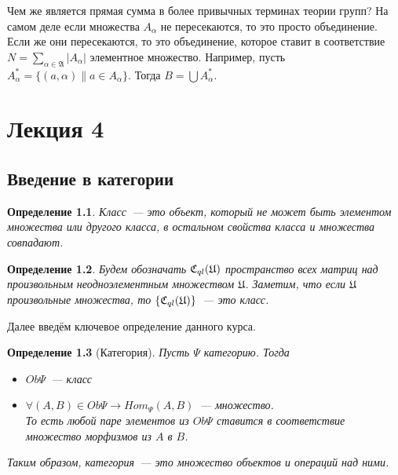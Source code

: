 \documentclass[a4paper, 12pt]{report}
\newtheorem{definition}{Определение}[chapter]
\begin{document}
Чем же является прямая сумма в более привычных терминах теории групп? На самом деле если множества $A_{\alpha}$ не пересекаются, то это просто объединение. Если же они пересекаются, то это объединение, которое ставит в соответствие $N = \sum_{\alpha\in\mathfrak{A}} |A_{\alpha}|$ элементное множество. Например, пусть $A^*_{\alpha} = \{(a, \alpha)\| a \in A_{\alpha}\}$. Тогда $B = \bigcup A^*_{\alpha}$.

\chapter{Лекция 4}
\section{Введение в категории}
\begin{definition}
Класс~--- это объект, который не может быть элементом множества или другого класса, в остальном свойства класса и множества совпадают.
\end{definition}

\begin{definition}
Будем обозначать $\mathfrak{C}_{ql}(\mathfrak{U})$ пространство всех матриц над произвольным неодноэлементным множеством $\mathfrak{U}$. Заметим, что если $\mathfrak{U}$ произвольные множества, то $\{\mathfrak{C}_{ql}(\mathfrak{U})\}$~--- это класс.
\end{definition}

Далее введём ключевое определение данного курса.

\begin{definition}[Категория]
Пусть $\Psi$ категорию. Тогда
\begin{itemize}
  \item $Ob\Psi$~--- класс
  \item $\forall (A, B) \in Ob\Psi \rightarrow Hom_{\Psi} (A, B)$~--- множество. \\ То есть любой паре элементов из $Ob\Psi$ ставится в соответствие множество морфизмов из $A$ в $B$.
\end{itemize}
Таким образом, категория~--- это множество объектов и операций над ними.
\end{definition}
\end{document}

